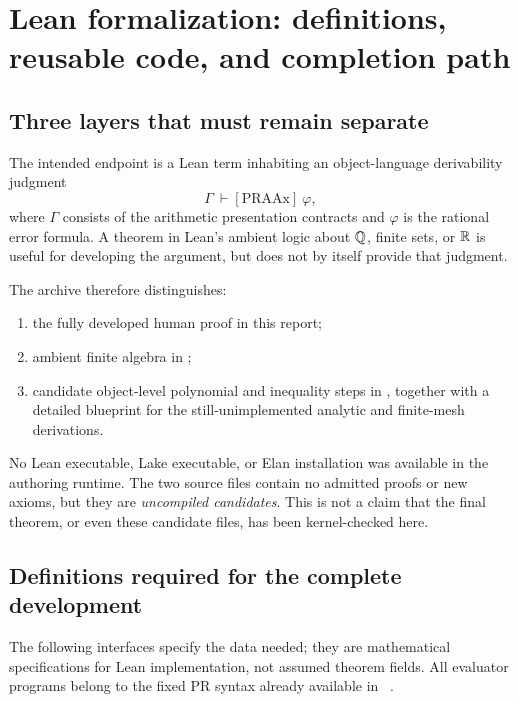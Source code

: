 \section{Lean formalization: definitions, reusable code, and completion path}\label{sec:lean}

\subsection{Three layers that must remain separate}

The intended endpoint is a Lean term inhabiting an object-language derivability judgment
\[
\Gamma\ \vdash[\mathrm{PRAAx}]\ \varphi,
\]
where $\Gamma$ consists of the arithmetic presentation contracts and $\varphi$ is the rational error formula. A theorem in Lean's ambient logic about $\mathbb Q$, finite sets, or $\mathbb R$ is useful for developing the argument, but does not by itself provide that judgment.

The archive therefore distinguishes:
\begin{enumerate}
\item the fully developed human proof in this report;
\item ambient finite algebra in ;
\item candidate object-level polynomial and inequality steps in , together with a detailed blueprint for the still-unimplemented analytic and finite-mesh derivations.
\end{enumerate}
No Lean executable, Lake executable, or Elan installation was available in the authoring runtime. The two source files contain no admitted proofs or new axioms, but they are \emph{uncompiled candidates}. This is not a claim that the final theorem, or even these candidate files, has been kernel-checked here.

\subsection{Definitions required for the complete development}

The following interfaces specify the data needed; they are mathematical specifications for Lean implementation, not assumed theorem fields. All evaluator programs belong to the fixed PR syntax already available in \repo\ \cite{repo-pr}.

